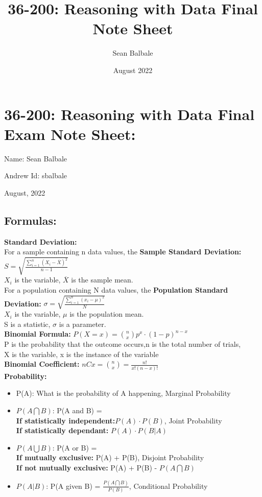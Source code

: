 \documentclass{article}
\title{36-200: Reasoning with Data Final Note Sheet}
\author{Sean Balbale}
\date{August 2022}
\begin{document}
\section*{36-200: Reasoning with Data Final Exam Note Sheet:}
\begin{enumerate*}[label={}]
    \item Name: Sean Balbale
    \item Andrew Id: sbalbale
    \item August, 2022
\end{enumerate*}
\subsection*{Formulas:}
\textbf{Standard Deviation:}
\\For a sample containing n data values, the \textbf{Sample Standard Deviation:}
$S = \sqrt{\frac{\sum_{i=1}^{n} (X_{i} - \overline{X})^2}{n-1}}$
\\$X_{i}$ is the variable, $\overline{X}$ is the sample mean.
\\For a population containing N data values, the \textbf{Population Standard Deviation:}
$\sigma = \sqrt{\frac{\sum_{i=1}^{n} (x_{i} - {\mu})^2}{N}}$
\\$X_{i}$ is the variable, $\mu$ is the population mean.
\\S is a statistic, $\sigma$ is a parameter.
\\\textbf{Binomial Formula:} 
$P(X = x) = {n \choose x} p^x \cdot (1-p)^{n-x}$
\\P is the probability that the outcome occurs,n is the total number of trials,
\\X is the variable, x is the instance of the variable
\\\textbf{Binomial Coefficient:} $nCx = {n \choose x} = \frac{n!}{x!(n-x)!}$
\\\textbf{Probability:}
\begin{itemize}
    \item P(A): What is the probability of A happening, Marginal Probability
    \item $P(A \bigcap B)$: P(A and B) = 
    \\\textbf{If statistically independent:}$P(A) \cdot P(B)$, Joint Probability
    \\\textbf{If statistically dependant:} $P(A) \cdot P(B|A)$
    \item $P(A \bigcup B)$: P(A or B) = 
    \\\textbf{If mutually exclusive:} P(A) + P(B), Disjoint Probability
    \\\textbf{If not mutually exclusive:} P(A) + P(B) - $P(A \bigcap B)$
    \item $P(A|B)$: P(A given B) = $\frac{P(A \bigcap B)}{P(B)}$, Conditional Probability
\end{itemize}
\end{document}
